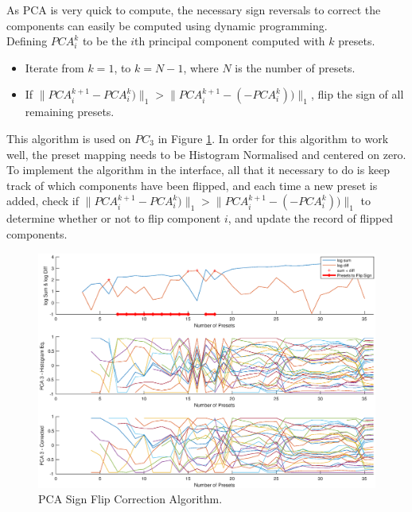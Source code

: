 \documentclass[11pt, oneside]{report}   	%
\begin{document}
As PCA is very quick to compute, the necessary sign reversals to correct the components can easily be computed using dynamic programming.\\ Defining $PCA_i^k$ to be the $i$th principal component computed with $k$ presets.
\vspace{-10pt}
\begin{itemize}
		\setlength\itemsep{-1.2em}
	\item 
Iterate from $k = 1$, to $k = N-1$, where $N$ is the number of presets.
	\item 
If $\|PCA_i^{k+1} - PCA_i^k)\|_1 > \|PCA_i^{k+1} - (-PCA_i^k))\|_1$,  flip the sign of all remaining presets.
\end{itemize}
This algorithm is used on $PC_3$ in Figure \ref{fig:PCAnumPresets2}. In order for this algorithm to work well, the preset mapping needs to be Histogram Normalised and centered on zero. To implement the algorithm in the interface, all that it necessary to do is keep track of which components have been flipped, and each time a new preset is added, check if $\|PCA_i^{k+1} - PCA_i^k)\|_1 > \|PCA_i^{k+1} - (-PCA_i^k))\|_1$ to determine whether or not to flip component $i$, and update the record of flipped components. 

\begin{figure}
	\hspace{-40pt}
	\includegraphics[trim={0, 1cm, 0, 1cm}, clip, width = 7in]{PCAnumPresets2.eps}
	\caption{PCA Sign Flip Correction Algorithm.}
	\label{fig:PCAnumPresets2}
\end{figure}
\end{document}
